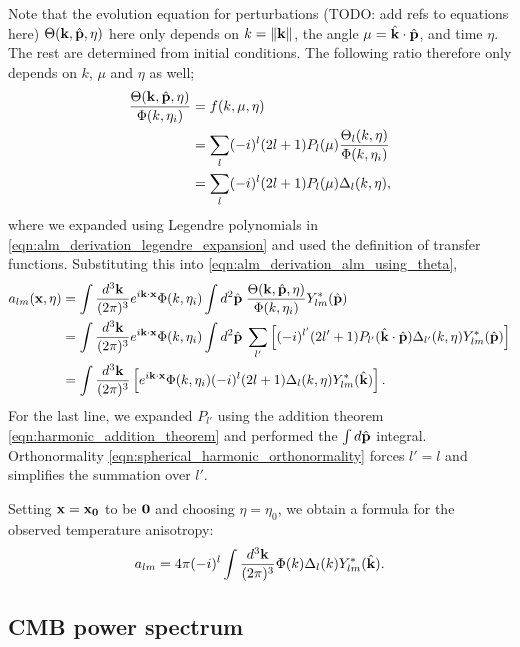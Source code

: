 Note that the evolution equation for perturbations (TODO: add refs to equations here) $\Theta(\mathbf{k},\hat{\mathbf{p}},\eta)$ here only depends on $k=\|\mathbf{k}\|$, the angle $\mu = \hat{\mathbf{k}} \cdot \hat{\mathbf{p}}$, and time $\eta$. The rest are determined from initial conditions. The following ratio therefore only depends on $k$, $\mu$ and $\eta$ as well;
\begin{align}
	\frac{\Theta(\mathbf{k},\hat{\mathbf{p}},\eta)}{\Phi(k,\eta_i)} &= f(k, \mu, \eta) \\
	&= \sum_l (-i)^l (2l+1) P_l(\mu) \frac{\Theta_l(k,\eta)}{\Phi(k,\eta_i)} \label{eqn:alm_derivation_legendre_expansion}\\ 
	&= \sum_l (-i)^l (2l+1) P_l(\mu) \Delta_l(k,\eta),
\end{align}
where we expanded using Legendre polynomials in \eqref{eqn:alm_derivation_legendre_expansion} and used the definition of transfer functions. Substituting this into \eqref{eqn:alm_derivation_alm_using_theta},
\begin{align}
	a_{lm}(\mathbf{x},\eta) &= \int \frac{d^3\mathbf{k}}{(2\pi)^3} e^{i\mathbf{k}\cdot\mathbf{x}} \Phi(k, \eta_i) \int d^2\hat{\mathbf{p}} \; \frac{\Theta(\mathbf{k},\hat{\mathbf{p}},\eta)}{\Phi(k, \eta_i)} Y^*_{lm}(\hat{\mathbf{p}}) \\
	&= \int \frac{d^3\mathbf{k}}{(2\pi)^3} e^{i\mathbf{k}\cdot\mathbf{x}} \Phi(k, \eta_i) \int d^2\hat{\mathbf{p}} \; \sum_{l'} \left[ (-i)^{l'} (2l'+1) P_{l'}(\hat{\mathbf{k}}\cdot\hat{\mathbf{p}}) \Delta_{l'}(k,\eta) Y^*_{lm}(\hat{\mathbf{p}}) \right] \\
	&= \int \frac{d^3\mathbf{k}}{(2\pi)^3} \left[ e^{i\mathbf{k}\cdot\mathbf{x}} \Phi(k, \eta_i) (-i)^{l} (2l+1) \Delta_{l}(k,\eta) Y^*_{lm}(\hat{\mathbf{k}}) \right].
\end{align}
For the last line, we expanded $P_{l'}$ using the addition theorem \eqref{eqn:harmonic_addition_theorem} and performed the $\int d\hat{\mathbf{p}}$ integral. Orthonormality \eqref{eqn:spherical_harmonic_orthonormality} forces $l'=l$ and simplifies the summation over $l'$.

Setting $\mathbf{x}=\mathbf{x_0}$ to be $\mathbf{0}$ and choosing $\eta=\eta_0$, we obtain a formula for the observed temperature anisotropy:
\begin{align}
	a_{lm} = 4\pi (-i)^l \int \frac{d^3\mathbf{k}}{(2\pi)^3} \Phi(k) \Delta_{l}(k) Y^*_{lm}(\hat{\mathbf{k}}).
\end{align}

\subsection{CMB power spectrum}


